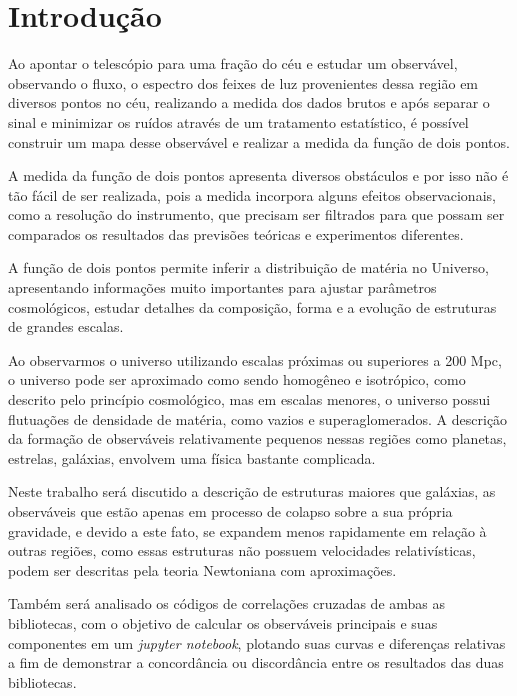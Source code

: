 	\chapter*{Introdução}

 Ao apontar o telescópio para uma fração do céu e estudar um observável, observando o fluxo, o espectro dos feixes de luz provenientes dessa região em diversos pontos no céu, realizando a medida dos dados brutos e após separar o sinal e minimizar os ruídos através de um tratamento estatístico, é possível construir um mapa desse observável e realizar a medida da função de dois pontos.
 
 A medida da função de dois pontos apresenta diversos obstáculos e por isso não é tão fácil de ser realizada, pois a medida incorpora alguns efeitos observacionais, como a resolução do instrumento, que precisam ser filtrados para que possam ser comparados os resultados das previsões teóricas e experimentos diferentes. 

A função de dois pontos permite inferir a distribuição de matéria no Universo, apresentando informações muito importantes para ajustar parâmetros cosmológicos, estudar detalhes da composição, forma e a evolução de estruturas de grandes escalas.

Ao observarmos o universo utilizando escalas próximas ou superiores a 200 Mpc, o universo pode ser aproximado como sendo homogêneo e isotrópico, como descrito pelo princípio cosmológico, mas em escalas menores, o universo possui flutuações de densidade de matéria, como vazios e superaglomerados. A descrição da formação de observáveis relativamente pequenos nessas regiões como planetas, estrelas, galáxias, envolvem uma física bastante complicada.

Neste trabalho será discutido a descrição de estruturas maiores que galáxias, as observáveis que estão apenas em processo de colapso sobre a sua própria gravidade, e devido a este fato, se expandem menos rapidamente em relação à outras regiões, como essas estruturas não possuem velocidades relativísticas, podem ser descritas pela teoria Newtoniana com aproximações.

Também será analisado os códigos de correlações cruzadas de ambas as bibliotecas, com  o objetivo de calcular os observáveis principais e suas componentes em um \textit{jupyter notebook}, plotando suas curvas e diferenças relativas a fim de demonstrar a concordância ou discordância entre os resultados das duas bibliotecas.





		